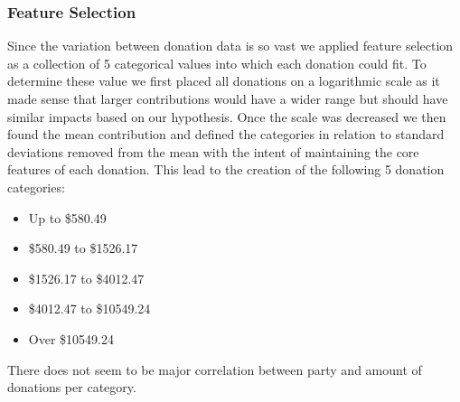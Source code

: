 \documentclass[journal]{IEEEtran}
\begin{document}
 \subsubsection{Feature Selection} 
 Since the variation between donation data is so vast we applied feature selection as a collection of 5
 categorical values into which each donation could fit. To determine these value we first placed all donations on a logarithmic scale
 as it made sense that larger contributions would have a wider range but should have similar impacts based on our hypothesis. Once
 the scale was decreased we then found the mean contribution and defined the categories in relation to standard deviations removed 
 from the mean with the intent of maintaining the core features of each donation. This lead to the creation of the following 5 
 donation categories:
 \begin{itemize}
  \item Up to \$580.49
  \item \$580.49 to \$1526.17
  \item \$1526.17 to \$4012.47
  \item \$4012.47 to \$10549.24
  \item Over \$10549.24
 \end{itemize}
 There does not seem to be major correlation between party and amount of donations per category\footnotemark.\\
\end{document}

